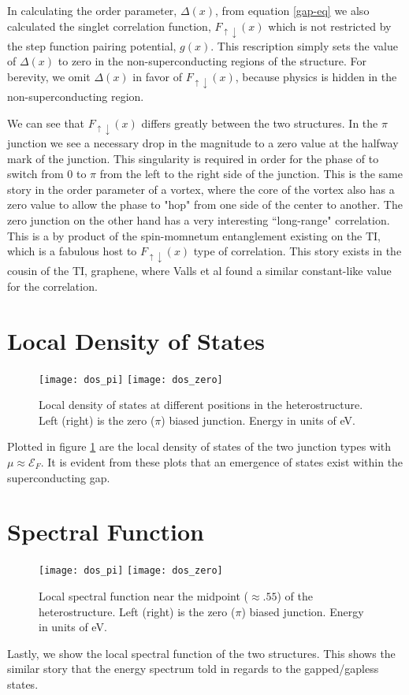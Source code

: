 \documentclass[11pt]{report}
\begin{document}
In calculating the order parameter, $\Delta(x)$, from equation \ref{gap-eq} we also calculated the singlet correlation function, $F_{\uparrow\downarrow}(x)$ which is not restricted by the step function pairing potential, $g(x)$. This rescription simply sets the value of $\Delta(x)$ to zero in the non-superconducting regions of the structure. For berevity, we omit $\Delta(x)$ in favor of $F_{\uparrow\downarrow}(x)$, because physics is hidden in the non-superconducting region.

We can see that $F_{\uparrow\downarrow}(x)$ differs greatly between the two structures. In the $\pi$ junction we see a necessary drop in the magnitude to a zero value at the halfway mark of the junction. This singularity is required in order for the phase of to switch from 0 to $\pi$ from the left to the right side of the junction. This is the same story in the order parameter of a vortex, where the core of the vortex also has a zero value to allow the phase to "hop" from one side of the center to another. The zero junction on the other hand has a very interesting ``long-range" correlation. This is a by product of the spin-momnetum entanglement existing on the TI, which is a fabulous host to $F_{\uparrow\downarrow}(x)$ type of correlation. This story exists in the cousin of the TI, graphene, where Valls et al found a similar constant-like value for the correlation. 

\section{Local Density of States}
\begin{figure}
\texttt{[image: dos\_pi]}
\texttt{[image: dos\_zero]}
\caption{Local density of states at different positions in the heterostructure. Left (right) is the zero ($\pi$) biased junction. Energy in units of eV.
}\label{ldos-jj}
\end{figure}
Plotted in figure \ref{ldos-jj} are the local density of states of the two junction types with $\mu \approx \mathcal{E}_F$. It is evident from these plots that an emergence of states exist within the superconducting gap. 

\section{Spectral Function}
\begin{figure}
\texttt{[image: dos\_pi]}
\texttt{[image: dos\_zero]}
\caption{Local spectral function near the midpoint ($\approx .55$) of the heterostructure. Left (right) is the zero ($\pi$) biased junction. Energy in units of eV.
}\label{spectral-jj}
\end{figure}
Lastly, we show the local spectral function of the two structures. This shows the similar story that the energy spectrum told in regards to the gapped/gapless states. 
\end{document}
